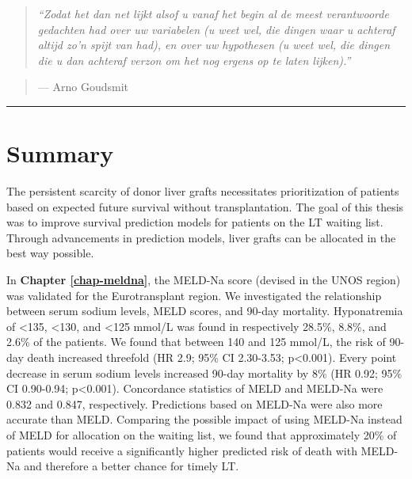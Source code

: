 \documentclass[11pt,english,]{book} %
\begin{document}
\begin{quote}
\emph{``Zodat het dan net lijkt alsof u vanaf het begin al de meest verantwoorde gedachten had over uw variabelen (u weet wel, die dingen waar u achteraf altijd zo'n spijt van had), en over uw hypothesen (u weet wel, die dingen die u dan achteraf verzon om het nog ergens op te laten lijken).''}
\end{quote}

\begin{quote}
--- Arno Goudsmit
\end{quote}

\begin{center}\rule{0.5\linewidth}{0.5pt}\end{center}

\newpage

\hypertarget{summ}{%
\chapter{Summary}\label{summ}}

\newpage
\nopagecolor
\color{black}

The persistent scarcity of donor liver grafts necessitates prioritization of patients based on expected future survival without transplantation. The goal of this thesis was to improve survival prediction models for patients on the LT waiting list. Through advancements in prediction models, liver grafts can be allocated in the best way possible.

In \textbf{Chapter \ref{chap-meldna}}, the MELD-Na score (devised in the UNOS region) was validated for the Eurotransplant region. We investigated the relationship between serum sodium levels, MELD scores, and 90-day mortality. Hyponatremia of \textless135, \textless130, and \textless125 mmol/L was found in respectively 28.5\%, 8.8\%, and 2.6\% of the patients. We found that between 140 and 125 mmol/L, the risk of 90-day death increased threefold (HR 2.9; 95\% CI 2.30-3.53; p\textless0.001). Every point decrease in serum sodium levels increased 90-day mortality by 8\% (HR 0.92; 95\% CI 0.90-0.94; p\textless0.001). Concordance statistics of MELD and MELD-Na were 0.832 and 0.847, respectively. Predictions based on MELD-Na were also more accurate than MELD. Comparing the possible impact of using MELD-Na instead of MELD for allocation on the waiting list, we found that approximately 20\% of patients would receive a significantly higher predicted risk of death with MELD-Na and therefore a better chance for timely LT.
\end{document}
